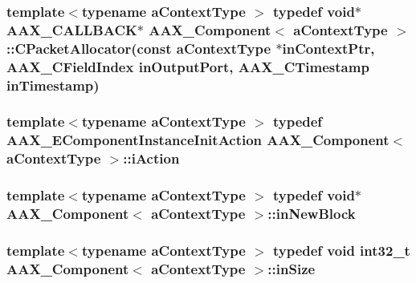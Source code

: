 \subsubsection[{C\+Packet\+Allocator}]{\setlength{\rightskip}{0pt plus 5cm}template$<$typename a\+Context\+Type $>$ typedef {\bf void}$\ast$ {\bf A\+A\+X\+\_\+\+C\+A\+L\+L\+B\+A\+C\+K}$\ast$ {\bf A\+A\+X\+\_\+\+Component}$<$ a\+Context\+Type $>$\+::C\+Packet\+Allocator(const a\+Context\+Type $\ast$in\+Context\+Ptr, {\bf A\+A\+X\+\_\+\+C\+Field\+Index} in\+Output\+Port, {\bf A\+A\+X\+\_\+\+C\+Timestamp} in\+Timestamp)}\label{a00029_abdfa84e561bac489ea7e24bd6bd4eeb1}
\hypertarget{a00029_a12812608d78f94dfc2f6679224481c85}{}
\subsubsection[{i\+Action}]{\setlength{\rightskip}{0pt plus 5cm}template$<$typename a\+Context\+Type $>$ typedef {\bf A\+A\+X\+\_\+\+E\+Component\+Instance\+Init\+Action} {\bf A\+A\+X\+\_\+\+Component}$<$ a\+Context\+Type $>$\+::{\bf i\+Action}}\label{a00029_a12812608d78f94dfc2f6679224481c85}
\hypertarget{a00029_a6111e5eb030776fe458760ec971243b1}{}
\subsubsection[{in\+New\+Block}]{\setlength{\rightskip}{0pt plus 5cm}template$<$typename a\+Context\+Type $>$ typedef {\bf void}$\ast$ {\bf A\+A\+X\+\_\+\+Component}$<$ a\+Context\+Type $>$\+::{\bf in\+New\+Block}}\label{a00029_a6111e5eb030776fe458760ec971243b1}
\hypertarget{a00029_a2fe0266dfbbf88bb690d8137e3c2f050}{}
\subsubsection[{in\+Size}]{\setlength{\rightskip}{0pt plus 5cm}template$<$typename a\+Context\+Type $>$ typedef {\bf void} {\bf int32\+\_\+t} {\bf A\+A\+X\+\_\+\+Component}$<$ a\+Context\+Type $>$\+::{\bf in\+Size}}\label{a00029_a2fe0266dfbbf88bb690d8137e3c2f050}
\hypertarget{a00029_a0a1040cbf35839573f9c3e477abd6195}{}
